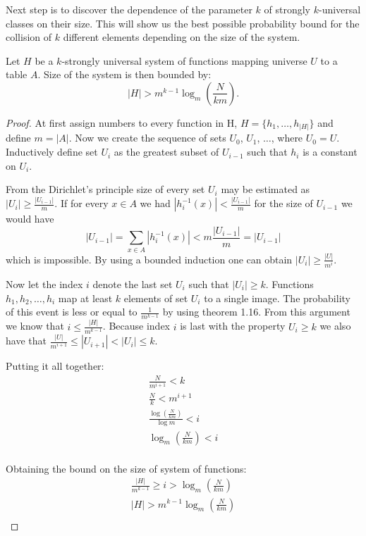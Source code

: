 Next step is to discover the dependence of the parameter $k$ of strongly $k$-universal classes on their size. This will show us the best possible probability bound for the collision of $k$ different elements depending on the size of the system.
\begin{theorem}
Let $H$ be a $k$-strongly universal system of functions mapping universe $U$ to a table $A$. Size of the system is then bounded by:
\begin{displaymath}
|H| > m^{k - 1} \log_m \left( \frac{N}{km} \right) \textit{.}
\end{displaymath}
\end{theorem}
\begin{proof}
At first assign numbers to every function in H, $H = \{h_1, \dots, h_{|H|}\}$ and define $m = |A|$. Now we create the sequence of sets $U_0$, $U_1$, $\dots$, where $U_0 = U$. Inductively define set $U_i$ as the greatest subset of $U_{i - 1}$ such that $h_i$ is a constant on $U_i$. 

From the Dirichlet's principle size of every set $U_i$ may be estimated as $|U_i| \geq \frac{|U_{i - 1}|}{m}$. If for every $x \in A$ we had $|\displaystyle h_{i}^{-1}(x)| < \frac{|U_{i - 1}|}{m}$ for the size of $U_{i -1}$ we would have \[|U_{i -1}| = \displaystyle\sum_{x \in A} |\displaystyle h_{i}^{-1}(x)| < m\frac{|U_{i - 1}|}{m} = |U_{i -1}|\] which is impossible. By using a bounded induction one can obtain $|U_i| \geq \frac{|U|}{m^i}$.

Now let the index $i$ denote the last set $U_i$ such that $|U_i| \geq k$. Functions $h_1, h_2,\dots, h_i$ map at least $k$ elements of set $U_i$ to a single image. The probability of this event is less or equal to $\frac{1}{m ^ {k - 1}}$ by using theorem 1.16. From this argument we know that $i \leq \frac{|H|}{m ^ {k - 1}}$. Because index $i$ is last with the property $U_i \geq k$ we also have that $\frac{|U|}{m ^ {i + 1}} \leq |U_{i + 1}| < |U_i| \leq k$. 

Putting it all together:
\begin{gather*}
\frac{N}{m^{i + 1}} < k \\
\frac{N}{k} < m ^ {i + 1} \\
\frac{\log \left( \frac{N}{km} \right)}{\log m} < i \\
\log_m \left( \frac{N}{km} \right) < i \\
\end{gather*}

Obtaining the bound on the size of system of functions:
\begin{gather*}
\frac{|H|}{m^{k - 1}} \geq i > \log_m \left( \frac{N}{km} \right) \\
|H| > m^{k - 1} \log_m \left( \frac{N}{km} \right) \\
\end{gather*}
\end{proof}

